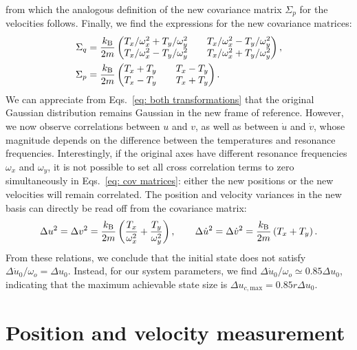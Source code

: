 %
from which the analogous definition of the new covariance matrix $\Sigma_p$ for the velocities follows. Finally, we find the expressions for the new covariance matrices:
%
\begin{subequations}
\label{eq: cov matrices}
\begin{align}
\Sigma_q &= \frac{k_\text{B}}{2m} \begin{pmatrix}
T_x/\omega_x^2 + T_y/\omega_y^2 && T_x/\omega_x^2 - T_y/\omega_y^2 \\
T_x/\omega_x^2 - T_y/\omega_y^2 && T_x/\omega_x^2 + T_y/\omega_y^2 \end{pmatrix},
\\
\Sigma_p &= \frac{k_\text{B}}{2m} \begin{pmatrix}
T_x + T_y && T_x - T_y \\
T_x - T_y && T_x + T_y \end{pmatrix}.
\end{align}
\end{subequations}
%
We can appreciate from Eqs.~\eqref{eq: both transformations} that the original Gaussian distribution remains Gaussian in the new frame of reference. However, we now observe correlations between $u$ and $v$, as well as between $\dot{u}$ and $\dot{v}$, whose magnitude depends on the difference between the temperatures and resonance frequencies. Interestingly, if the original axes have different resonance frequencies $\omega_x$ and $\omega_y$, it is not possible to set all cross correlation terms to zero simultaneously in Eqs.~\eqref{eq: cov matrices}: either the new positions or the new velocities will remain correlated. The position and velocity variances in the new basis can directly be read off from the covariance matrix:
%
\begin{equation}
    \label{eq:variances_uv_basis}
    \Delta u^2 = \Delta v^2 =
    \frac{k_\text{B}}{2m} \left(\frac{T_x}{\omega_x^2} +
    \frac{T_y}{\omega_y^2} \right),
    \qquad
    \Delta \dot{u}^2 = \Delta \dot{v}^2 =
    \frac{k_\text{B}}{2m} \left( {T_x} + {T_y} \right).
\end{equation}
%
From these relations, we conclude that the initial state does not satisfy $\Delta\dot{u}_0/\omega_o = \Delta u_0$. Instead, for our system parameters, we find $\Delta\dot{u}_0/\omega_o \simeq 0.85\Delta u_0$, indicating that the maximum achievable state size is $\Delta u_{c,\text{max}}=0.85r\Delta u_0$.



\section{Position and velocity measurement}
\label{sec:SM_data_analysis}
